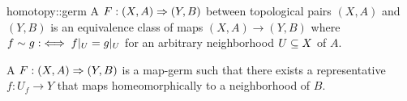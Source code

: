 \begin{mydefinition}{homotopy::germ}
    A  $F: (X, A) \Rightarrow{} (Y, B)$ between topological pairs $(X, A)$ and $(Y, B)$ is an equivalence class of maps $(X, A) \to (Y, B)$
    where $f \sim g :\iff f\vert_{U} = g\vert_{U}$ for an arbitrary neighborhood $U \subseteq{} X$ of $A$. 
\end{mydefinition}

\begin{myparagraph}
    A  $F: (X, A) \Rightarrow{} (Y, B)$ is a map-germ
    such that there exists a representative $f: U_f \to Y$ that maps homeomorphically to a neighborhood of $B$.  
\end{myparagraph}